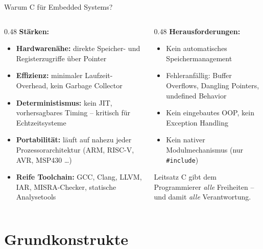 \documentclass[%
  aspectratio=169,
  10pt
]{beamer}
\begin{document}
\begin{frame}{Warum C für Embedded Systems?}
  \begin{columns}[T]
    \begin{column}{0.48\textwidth}
      \textbf{Stärken:}
      \begin{itemize}
        \item \textbf{Hardwarenähe:} direkte Speicher- und
              Registerzugriffe über Pointer
        \item \textbf{Effizienz:} minimaler Laufzeit-Overhead,
              kein Garbage Collector
        \item \textbf{Deterministismus:} kein JIT, vorhersagbares
              Timing -- kritisch für Echtzeitsysteme
        \item \textbf{Portabilität:} läuft auf nahezu jeder
              Prozessorarchitektur (ARM, RISC-V, AVR, MSP430 \ldots)
        \item \textbf{Reife Toolchain:} GCC, Clang, LLVM, IAR,
              MISRA-Checker, statische Analysetools
      \end{itemize}
    \end{column}
    \begin{column}{0.48\textwidth}
      \textbf{Herausforderungen:}
      \begin{itemize}
        \item Kein automatisches Speichermanagement
        \item Fehleranfällig: Buffer Overflows, Dangling Pointers,
              undefined Behavior
        \item Kein eingebautes OOP, kein Exception Handling
        \item Kein nativer Modulmechanismus (nur \texttt{\#include})
      \end{itemize}
      \vspace{0.4em}
      \begin{alertblock}{Leitsatz}
        C gibt dem Programmierer \emph{alle} Freiheiten -- \\
        und damit \emph{alle} Verantwortung.
      \end{alertblock}
    \end{column}
  \end{columns}
\end{frame}

\section{Grundkonstrukte}
\end{document}
